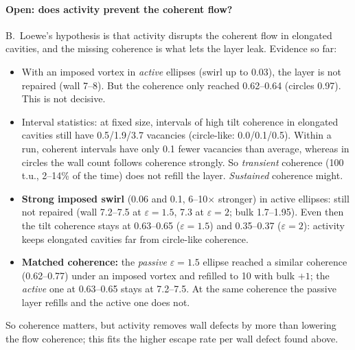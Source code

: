 \documentclass[11pt,a4paper]{article}
\begin{document}
\paragraph{Open: does activity prevent the coherent flow?} B.~Loewe's hypothesis is that activity disrupts the coherent flow in elongated cavities, and the missing
coherence is what lets the layer leak. Evidence so far:
\begin{itemize}
  \item With an imposed vortex in \emph{active} ellipses (swirl up to 0.03), the layer is not repaired (wall 7--8). But the coherence only reached 0.62--0.64 (circles 0.97).
        This is not decisive.
  \item Interval statistics: at fixed size, intervals of high tilt coherence in elongated cavities still have 0.5/1.9/3.7 vacancies (circle-like: 0.0/0.1/0.5). Within a
        run, coherent intervals have only 0.1 fewer vacancies than average, whereas in circles the wall count follows coherence strongly. So \emph{transient} coherence
        (100\,t.u., 2--14\% of the time) does not refill the layer. \emph{Sustained} coherence might.
  \item \textbf{Strong imposed swirl} (0.06 and 0.1, 6--10$\times$ stronger) in active ellipses: still not repaired (wall 7.2--7.5 at $\varepsilon=1.5$, 7.3 at $\varepsilon=2$; bulk 1.7--1.95).
        Even then the tilt coherence stays at 0.63--0.65 ($\varepsilon=1.5$) and 0.35--0.37 ($\varepsilon=2$): activity keeps elongated cavities far from circle-like coherence.
  \item \textbf{Matched coherence:} the \emph{passive} $\varepsilon=1.5$ ellipse reached a similar coherence (0.62--0.77) under an imposed vortex and refilled to 10 with bulk $+1$; the
        \emph{active} one at 0.63--0.65 stays at 7.2--7.5. At the same coherence the passive layer refills and the active one does not.
\end{itemize}
So coherence matters, but activity removes wall defects by more than lowering the flow coherence; this fits the higher escape rate per wall defect found above.

\end{document}

